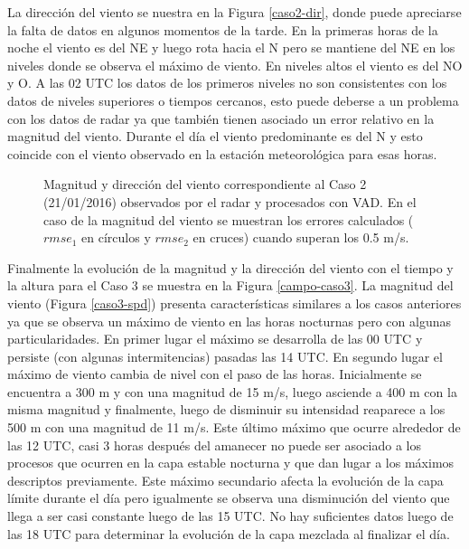 \documentclass[12pt,spanish,oneside]{book}
\begin{document}
La dirección del viento se nuestra en la Figura \ref{caso2-dir}, donde
puede apreciarse la falta de datos en algunos momentos de la tarde. En
la primeras horas de la noche el viento es del NE y luego rota hacia el
N pero se mantiene del NE en los niveles donde se observa el máximo de
viento. En niveles altos el viento es del NO y O. A las 02 UTC los datos
de los primeros niveles no son consistentes con los datos de niveles
superiores o tiempos cercanos, esto puede deberse a un problema con los
datos de radar ya que también tienen asociado un error relativo en la
magnitud del viento. Durante el día el viento predominante es del N y
esto coincide con el viento observado en la estación meteorológica para
esas horas.

\begin{figure}
\newline{}\caption{Magnitud y dirección del viento  correspondiente al Caso 2 (21/01/2016) observados por el radar y procesados con VAD. En el caso de la magnitud del viento se muestran los errores calculados ($rmse_1$ en círculos y $rmse_2$ en cruces) cuando superan los 0.5 m/s. \label{campo-caso2}}\label{fig:campo-caso2}
\end{figure}

Finalmente la evolución de la magnitud y la dirección del viento con el
tiempo y la altura para el Caso 3 se muestra en la Figura
\ref{campo-caso3}. La magnitud del viento (Figura \ref{caso3-spd})
presenta características similares a los casos anteriores ya que se
observa un máximo de viento en las horas nocturnas pero con algunas
particularidades. En primer lugar el máximo se desarrolla de las 00 UTC
y persiste (con algunas intermitencias) pasadas las 14 UTC. En segundo
lugar el máximo de viento cambia de nivel con el paso de las horas.
Inicialmente se encuentra a 300 m y con una magnitud de 15 m/s, luego
asciende a 400 m con la misma magnitud y finalmente, luego de disminuir
su intensidad reaparece a los 500 m con una magnitud de 11 m/s. Este
último máximo que ocurre alrededor de las 12 UTC, casi 3 horas después
del amanecer no puede ser asociado a los procesos que ocurren en la capa
estable nocturna y que dan lugar a los máximos descriptos previamente.
Este máximo secundario afecta la evolución de la capa límite durante el
día pero igualmente se observa una disminución del viento que llega a
ser casi constante luego de las 15 UTC. No hay suficientes datos luego
de las 18 UTC para determinar la evolución de la capa mezclada al
finalizar el día.
\end{document}
